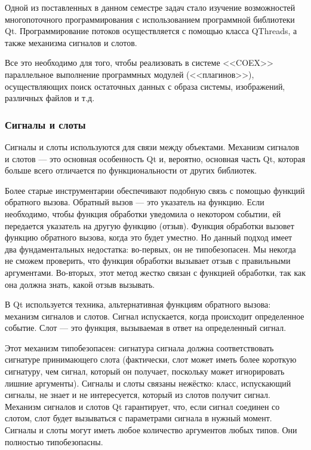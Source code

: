 Одной из поставленных в данном семестре задач стало изучение возможностей многопоточного программирования с использованием программной библиотеки Qt. Программирование потоков осуществляется с помощью класса QThreads, а также механизма сигналов и слотов.

Все это необходимо для того, чтобы реализовать в системе <<COEX>> параллельное выполнение программных модулей (<<плагинов>>), осуществляющих поиск остаточных данных с образа системы, изображений, различных файлов и т.д. 

\subsubsection{Сигналы и слоты}

Сигналы и слоты используются для связи между объектами. Механизм сигналов и слотов --- это основная особенность Qt и, вероятно, основная часть Qt, которая больше всего отличается по функциональности от других библиотек.

Более старые инструментарии обеспечивают подобную связь с помощью функций обратного вызова. Обратный вызов --- это указатель на функцию. Если необходимо, чтобы функция обработки уведомила о некотором событии, ей передается указатель на другую функцию (отзыв). Функция обработки вызовет функцию обратного вызова, когда это будет уместно. Но данный подход имеет два фундаментальных недостатка: во-первых, он не типобезопасен. Мы некогда не сможем проверить, что функция обработки вызывает отзыв с правильными аргументами. Во-вторых, этот метод жестко связан с функцией обработки, так как она должна знать, какой отзыв вызывать.

В Qt используется техника, альтернативная функциям обратного вызова: механизм сигналов и слотов. Сигнал испускается, когда происходит определенное событие. Слот --- это функция, вызываемая в ответ на определенный сигнал.

Этот механизм типобезопасен: сигнатура сигнала должна соответствовать сигнатуре принимающего слота (фактически, слот может иметь более короткую сигнатуру, чем сигнал, который он получает, поскольку может игнорировать лишние аргументы). Сигналы и слоты связаны нежёстко: класс, испускающий сигналы, не знает и не интересуется, который из слотов получит сигнал. Механизм сигналов и слотов Qt гарантирует, что, если сигнал соединен со слотом, слот будет вызываться с параметрами сигнала в нужный момент. Сигналы и слоты могут иметь любое количество аргументов любых типов. Они полностью типобезопасны.

